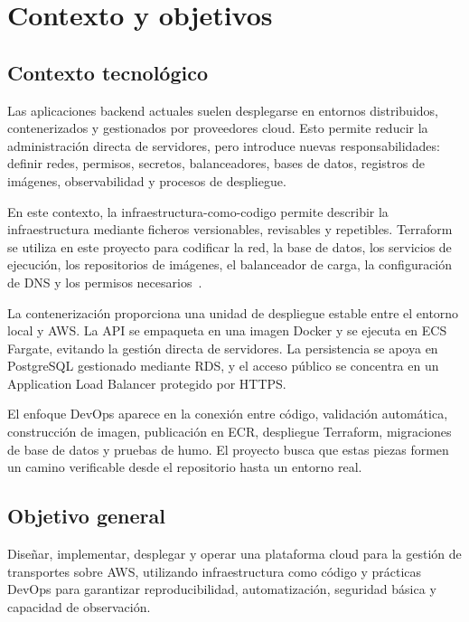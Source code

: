 \chapter{Contexto y objetivos}
\label{chap:contexto-objetivos}

\section{Contexto tecnológico}
\label{sec:contexto-tecnologico}

Las aplicaciones backend actuales suelen desplegarse en entornos distribuidos, contenerizados y gestionados por proveedores cloud. Esto permite reducir la administración directa de servidores, pero introduce nuevas responsabilidades: definir redes, permisos, secretos, balanceadores, bases de datos, registros de imágenes, observabilidad y procesos de despliegue.

En este contexto, la \gls{infraestructura-como-codigo} permite describir la infraestructura mediante ficheros versionables, revisables y repetibles. Terraform se utiliza en este proyecto para codificar la red, la base de datos, los servicios de ejecución, los repositorios de imágenes, el balanceador de carga, la configuración de DNS y los permisos necesarios~\cite{TerraformDocs}.

La contenerización proporciona una unidad de despliegue estable entre el entorno local y AWS. La API se empaqueta en una imagen Docker y se ejecuta en ECS Fargate, evitando la gestión directa de servidores. La persistencia se apoya en PostgreSQL gestionado mediante RDS, y el acceso público se concentra en un Application Load Balancer protegido por HTTPS.

El enfoque DevOps aparece en la conexión entre código, validación automática, construcción de imagen, publicación en ECR, despliegue Terraform, migraciones de base de datos y pruebas de humo. El proyecto busca que estas piezas formen un camino verificable desde el repositorio hasta un entorno real.

\section{Objetivo general}
\label{sec:objetivo-general}

Diseñar, implementar, desplegar y operar una plataforma cloud para la gestión de transportes sobre AWS, utilizando infraestructura como código y prácticas DevOps para garantizar reproducibilidad, automatización, seguridad básica y capacidad de observación.

